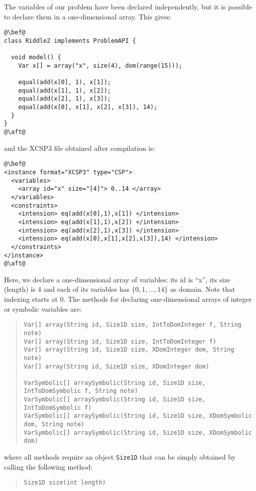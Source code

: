 \documentclass[10pt]{article}
\def\xt{{\rm XCSP3}\xspace}
\newcommand{\nn}[1]{{\tt #1}} %
\def\xt{{\rm XCSP3}\xspace}
\begin{document}
The variables of our problem have been declared independently, but it is possible to declare them in a one-dimensional array.
This gives:

\begin{lstlisting}
@\bef@
class Riddle2 implements ProblemAPI {

  void model() {
    Var x[] = array("x", size(4), dom(range(15)));
    
    equal(add(x[0], 1), x[1]);
    equal(add(x[1], 1), x[2]);
    equal(add(x[2], 1), x[3]);
    equal(add(x[0], x[1], x[2], x[3]), 14);
  }
}
@\aft@
\end{lstlisting}

and the \xt file obtained after compilation is:

\begin{lstlisting}
@\bef@
<instance format="XCSP3" type="CSP">
  <variables>
    <array id="x" size="[4]"> 0..14 </array>
  </variables>
  <constraints>
    <intension> eq(add(x[0],1),x[1]) </intension>
    <intension> eq(add(x[1],1),x[2]) </intension>
    <intension> eq(add(x[2],1),x[3]) </intension>
    <intension> eq(add(x[0],x[1],x[2],x[3]),14) </intension>
  </constraints>
</instance>
@\aft@
\end{lstlisting}

Here, we declare a one-dimensional array of variables: its id is ``x'', its size (length) is 4 and each of its variables has $\{0,1,\dots,14\}$ as domain.
Note that indexing starts at 0.
The methods for declaring one-dimensional arrays of integer or symbolic variables are:

\begin{quote}
\begin{verbatim}
Var[] array(String id, Size1D size, IntToDomInteger f, String note) 
Var[] array(String id, Size1D size, IntToDomInteger f) 
Var[] array(String id, Size1D size, XDomInteger dom, String note) 
Var[] array(String id, Size1D size, XDomInteger dom) 

VarSymbolic[] arraySymbolic(String id, Size1D size, IntToDomSymbolic f, String note) 
VarSymbolic[] arraySymbolic(String id, Size1D size, IntToDomSymbolic f) 
VarSymbolic[] arraySymbolic(String id, Size1D size, XDomSymbolic dom, String note) 
VarSymbolic[] arraySymbolic(String id, Size1D size, XDomSymbolic dom) 
\end{verbatim}
\end{quote}

where all methods require an object \nn{Size1D} that can be simply obtained by calling the following method:
\begin{quote}
\begin{verbatim}
Size1D size(int length)
\end{verbatim}
\end{quote}
\end{document}
